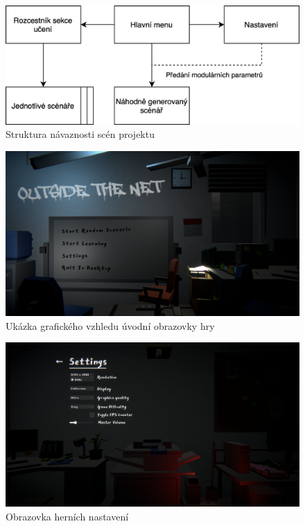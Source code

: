 \documentclass[12pt, a4paper,
 oneside,   
 openright
]{report}
\begin{document}
\begin{figure}[ht]
    \includegraphics[width=\columnwidth]{struktura_projektu.png}
    \centering
    \caption{Struktura návaznosti scén projektu}
    \label{fig:struktura_svg}
\end{figure}

\begin{figure}[ht]
    \includegraphics[width=\columnwidth]{menu.png}
    \centering
    \caption{Ukázka grafického vzhledu úvodní obrazovky hry}
    \label{fig:menu_img}
\end{figure}

\begin{figure}[ht]
    \includegraphics[width=\columnwidth]{nastaveni.png}
    \centering
    \caption{Obrazovka herních nastavení}
    \label{fig:nastaveni_img}
\end{figure}
\end{document}
